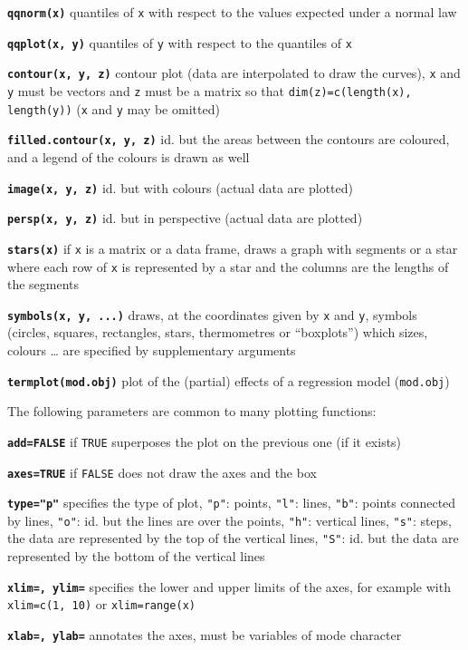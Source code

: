 \documentclass[10pt,landscape]{article}
\newcommand{\code}{\texttt}
\newcommand{\bcode}[1]{\texttt{\textbf{#1}}}
\newcommand\F{\code{FALSE}}
\newcommand\T{\code{TRUE}}
\begin{document}
\begin{multicols}{3}
\bcode{qqnorm(x)}  quantiles of \code{x} with respect to the values expected under a normal law

\bcode{qqplot(x, y)}  quantiles of \code{y} with respect to the quantiles of \code{x}

\bcode{contour(x, y, z)}  contour plot (data are interpolated to draw the curves), \code{x} and \code{y} must be vectors and \code{z} must be a matrix so that \code{dim(z)=c(length(x), length(y))} (\code{x} and \code{y} may be omitted)

\bcode{filled.contour(x, y, z)}  id. but the areas between the contours are coloured, and a legend of the colours is drawn as well

\bcode{image(x, y, z)}  id. but with colours (actual data are plotted)

\bcode{persp(x, y, z)}  id. but in perspective (actual data are plotted)

\bcode{stars(x)}  if \code{x} is a matrix or a data frame, draws a graph with segments or a star where each row of \code{x} is represented by a star and the columns are the lengths of the segments

\bcode{symbols(x, y, ...)}  draws, at the coordinates given by \code{x} and \code{y}, symbols (circles, squares, rectangles, stars, thermometres or ``boxplots'') which sizes, colours \ldots{} are specified by supplementary arguments

\bcode{termplot(mod.obj)}  plot of the (partial) effects of a regression model (\code{mod.obj})

The following parameters are common to many plotting functions:

\bcode{add=FALSE}  if \T{} superposes the plot on the previous one (if it exists)

\bcode{axes=TRUE}  if \F{} does not draw the axes and the box

\bcode{type="p"}  specifies the type of plot, \code{"p"}: points, \code{"l"}: lines, \code{"b"}: points connected by lines, \code{"o"}: id. but the lines are over the points, \code{"h"}: vertical lines, \code{"s"}: steps, the data are represented by the top of the vertical lines, \code{"S"}: id. but the data are represented by the bottom of the vertical lines

\bcode{xlim=, ylim=}  specifies the lower and upper limits of the axes, for example with \code{xlim=c(1, 10)} or \code{xlim=range(x)}

\bcode{xlab=, ylab=}  annotates the axes, must be variables of mode character


\end{multicols}
\end{document}
